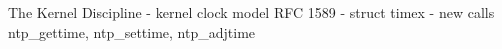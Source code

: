 









The Kernel Discipline -  kernel clock model RFC 1589 -
struct timex -
new calls ntp_gettime, ntp_settime, ntp_adjtime


